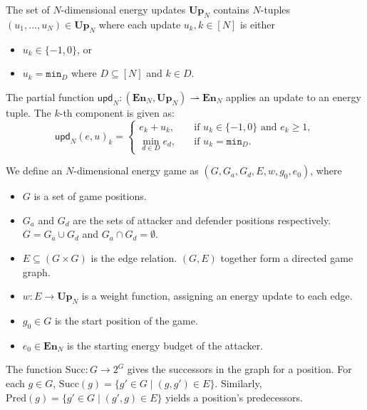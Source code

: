 \begin{definition}\label{def:update}
    The set of $N$-dimensional energy updates $\mathbf{Up}_N$ contains
    $N$-tuples $(u_1, \ldots, u_N) \in \mathbf{Up}_N$ where each update $u_k, k
    \in [N]$ is
    either
    \begin{itemize}
        \item $u_k \in \{-1, 0\}$, or
        \item $u_k = \mathtt{min}_D$ where $D \subseteq [N]$ and $k \in D$. %
    \end{itemize}

    The partial function
    $\mathsf{upd}_N: (\mathbf{En}_N, \mathbf{Up}_N) \rightharpoonup \mathbf{En}_N$
    applies an update to an energy tuple.
    The $k$-th component is given as:
    \begin{equation*}
        \mathsf{upd}_N{(e, u)}_k =
        \begin{cases}
            e_k + u_k,\quad &\text{if } u_k \in \{-1, 0\} \text{ and } e_k \geq 1, \\
            \min_{d \in D}{e_d},\quad &\text{if } u_k = \mathtt{min}_D. %
        \end{cases}
    \end{equation*}
\end{definition}

\begin{definition}\label{def:energy_game}
    We define an $N$-dimensional energy game as
    $(G, G_a, G_d, E, w, g_0, e_0)$, where
    \begin{itemize}
        \item $G$ is a set of game positions.
        \item $G_a$ and $G_d$ are the sets of attacker and defender positions
            respectively.
            $G = G_a \cup G_d$ and $G_a \cap G_d = \emptyset$.
        \item $E \subseteq (G \times G)$ is the edge relation. $(G, E)$
            together form a directed game graph.
        \item $w: E \rightarrow \mathbf{Up}_N$ is a weight function, assigning an
            energy update to each edge.
        \item $g_0 \in G$ is the start position of the game.
        \item $e_0 \in \mathbf{En}_N$ is the starting energy budget of the attacker.
    \end{itemize}

    The function $\mathrm{Succ}: G \rightarrow 2^G$ gives the successors in the
    graph for a position.
    For each $g \in G$, $\mathrm{Succ}(g) = \{g' \in G \mid (g, g') \in E\}$.
    Similarly, $\mathrm{Pred}(g) = \{g' \in G \mid (g', g) \in E\}$ yields a
    position's predecessors.
\end{definition}

